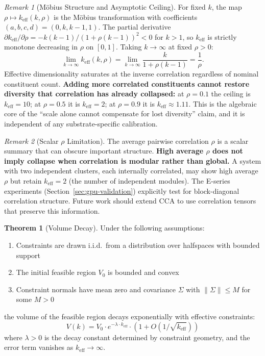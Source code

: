 \documentclass[11pt,a4paper]{article}
\theoremstyle{definition}
\newtheorem{theorem}{Theorem}[section]
\theoremstyle{remark}
\newtheorem{remark}{Remark}[section]
\newcommand{\keff}{k_{\text{eff}}}
\begin{document}
\begin{remark}[M\"obius Structure and Asymptotic Ceiling]
\label{sec:mobius}
For fixed $k$, the map $\rho \mapsto \keff(k, \rho)$ is the M\"obius transformation with coefficients $(a, b, c, d) = (0, k, k-1, 1)$. The partial derivative $\partial \keff / \partial \rho = -k(k-1)/(1 + \rho(k-1))^2 < 0$ for $k > 1$, so $\keff$ is strictly monotone decreasing in $\rho$ on $[0, 1]$. Taking $k \to \infty$ at fixed $\rho > 0$:
\begin{equation*}
\lim_{k \to \infty} \keff(k, \rho) = \lim_{k \to \infty} \frac{k}{1 + \rho(k-1)} = \frac{1}{\rho}.
\end{equation*}
Effective dimensionality saturates at the inverse correlation regardless of nominal constituent count. \textbf{Adding more correlated constituents cannot restore diversity that correlation has already collapsed:} at $\rho = 0.1$ the ceiling is $\keff = 10$; at $\rho = 0.5$ it is $\keff = 2$; at $\rho = 0.9$ it is $\keff \approx 1.11$. This is the algebraic core of the ``scale alone cannot compensate for lost diversity'' claim, and it is independent of any substrate-specific calibration.
\end{remark}

\begin{remark}[Scalar $\rho$ Limitation]
The average pairwise correlation $\rho$ is a scalar summary that can obscure important structure. \textbf{High average $\rho$ does not imply collapse when correlation is modular rather than global.} A system with two independent clusters, each internally correlated, may show high average $\rho$ but retain $\keff = 2$ (the number of independent modules). The E-series experiments (Section~\ref{sec:gpu-validation}) explicitly test for block-diagonal correlation structure. Future work should extend CCA to use correlation tensors that preserve this information.
\end{remark}

\begin{theorem}[Volume Decay]
\label{thm:volume-decay}
Under the following assumptions:
\begin{enumerate}[noitemsep,label=(\alph*)]
    \item Constraints are drawn i.i.d.\ from a distribution over halfspaces with bounded support
    \item The initial feasible region $V_0$ is bounded and convex
    \item Constraint normals have mean zero and covariance $\Sigma$ with $\|\Sigma\| \leq M$ for some $M > 0$
\end{enumerate}
the volume of the feasible region decays exponentially with effective constraints:
\begin{equation}
V(k) = V_0 \cdot e^{-\lambda \cdot \keff} \cdot (1 + O(1/\sqrt{\keff}))
\label{eq:volume_decay}
\end{equation}
where $\lambda > 0$ is the decay constant determined by constraint geometry, and the error term vanishes as $\keff \to \infty$.
\end{theorem}
\end{document}
